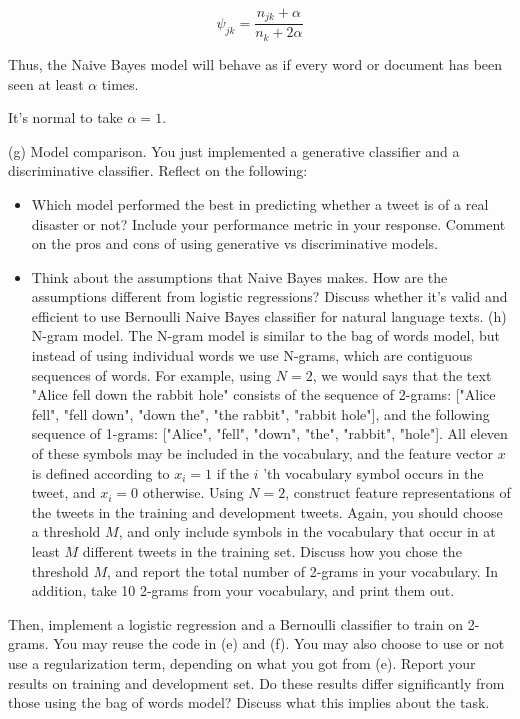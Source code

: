\documentclass[10pt]{article}
\begin{document}
$$
\psi_{j k}=\frac{n_{j k}+\alpha}{n_{k}+2 \alpha}
$$

Thus, the Naive Bayes model will behave as if every word or document has been seen at least $\alpha$ times.

It's normal to take $\alpha=1$.

(g) Model comparison. You just implemented a generative classifier and a discriminative classifier. Reflect on the following:

\begin{itemize}
  \item Which model performed the best in predicting whether a tweet is of a real disaster or not? Include your performance metric in your response. Comment on the pros and cons of using generative vs discriminative models.

  \item Think about the assumptions that Naive Bayes makes. How are the assumptions different from logistic regressions? Discuss whether it's valid and efficient to use Bernoulli Naive Bayes classifier for natural language texts. (h) N-gram model. The $\mathrm{N}$-gram model is similar to the bag of words model, but instead of using individual words we use $\mathrm{N}$-grams, which are contiguous sequences of words. For example, using $N=2$, we would says that the text "Alice fell down the rabbit hole" consists of the sequence of 2-grams: ["Alice fell", "fell down", "down the", "the rabbit", "rabbit hole"], and the following sequence of 1-grams: ["Alice", "fell", "down", "the", "rabbit", "hole"]. All eleven of these symbols may be included in the vocabulary, and the feature vector $x$ is defined according to $x_{i}=1$ if the $i$ 'th vocabulary symbol occurs in the tweet, and $x_{i}=0$ otherwise. Using $N=2$, construct feature representations of the tweets in the training and development tweets. Again, you should choose a threshold $M$, and only include symbols in the vocabulary that occur in at least $M$ different tweets in the training set. Discuss how you chose the threshold $M$, and report the total number of 2-grams in your vocabulary. In addition, take 10 2-grams from your vocabulary, and print them out.

\end{itemize}

Then, implement a logistic regression and a Bernoulli classifier to train on 2-grams. You may reuse the code in (e) and (f). You may also choose to use or not use a regularization term, depending on what you got from (e). Report your results on training and development set. Do these results differ significantly from those using the bag of words model? Discuss what this implies about the task.
\end{document}
